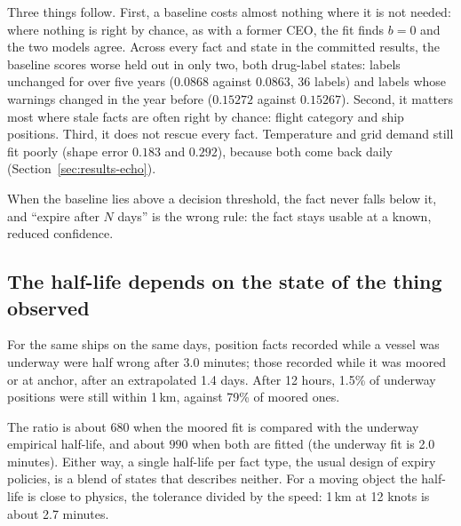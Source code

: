 Three things follow. First, a baseline costs almost nothing where it is not
needed: where nothing is right by chance, as with a former CEO, the fit
finds $b = 0$ and the two models agree. Across every fact and state in the
committed results, the baseline scores worse held out in only two, both
drug-label states: labels unchanged for over five years ($0.0868$ against
$0.0863$, 36 labels) and labels whose warnings changed in the year before
($0.15272$ against $0.15267$). Second, it matters most where stale facts are often right by
chance: flight category and ship positions. Third, it does not rescue every
fact. Temperature and grid demand still fit poorly (shape error $0.183$
and $0.292$), because both come back daily (Section~\ref{sec:results-echo}).

When the baseline lies above a decision threshold, the fact never falls
below it, and ``expire after $N$ days'' is the wrong rule: the fact stays
usable at a known, reduced confidence.

\subsection{The half-life depends on the state of the thing observed}\label{sec:results-state}

For the same ships on the same days, position facts recorded while a vessel
was underway were half wrong after 3.0 minutes; those recorded while it was
moored or at anchor, after an extrapolated 1.4 days. After 12 hours, 1.5\%
of underway positions were still within 1\,km, against 79\% of moored ones.

The ratio is about $680$ when the moored fit is compared with the underway
empirical half-life, and about $990$ when both are fitted (the underway fit
is 2.0 minutes). Either way, a single half-life per fact type, the usual
design of expiry policies, is a blend of states that describes neither. For
a moving object the half-life is close to physics, the tolerance divided by
the speed: 1\,km at 12 knots is about 2.7 minutes.

